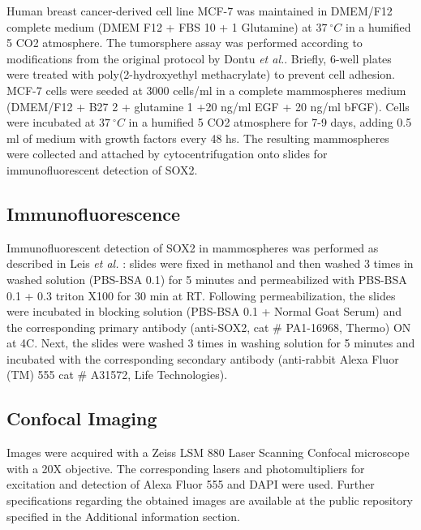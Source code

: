 \documentclass[fleqn,10pt]{wlscirep}
\begin{document}
Human breast cancer-derived cell line MCF-7 was maintained in DMEM/F12 complete medium (DMEM F12 + FBS 10 + 1 Glutamine) at $37 \ ^{\circ} C$ in a humified 5 CO2 atmosphere. The tumorsphere assay was performed according to modifications \cite{Leis} from the original protocol by Dontu \emph{et al.}\cite{Dontu}. Briefly, 6-well plates were treated with poly(2-hydroxyethyl methacrylate) to prevent cell adhesion. MCF-7 cells were seeded at 3000 cells/ml in a complete mammospheres medium (DMEM/F12 + B27 2 + glutamine 1 +20 ng/ml EGF + 20 ng/ml bFGF). Cells were incubated at $37\ ^{\circ} C$  in a humified 5 CO2 atmosphere for 7-9 days, adding 0.5 ml of medium with growth factors every 48 hs. The resulting mammospheres were collected and attached by cytocentrifugation onto slides for immunofluorescent detection of SOX2.

\subsection*{Immunofluorescence}

Immunofluorescent detection of SOX2 in mammospheres was performed as described in Leis \emph{et al.} \cite{Leis}: slides were fixed in methanol and then washed 3 times in washed solution (PBS-BSA 0.1) for 5 minutes and permeabilized with PBS-BSA 0.1 + 0.3 triton X100 for 30 min at RT. Following permeabilization, the slides were incubated in blocking solution (PBS-BSA 0.1 + Normal Goat Serum) and the corresponding primary antibody (anti-SOX2, cat \# PA1-16968, Thermo)  ON at 4C. Next, the slides were washed 3 times in washing solution for 5 minutes and incubated with the corresponding secondary antibody (anti-rabbit Alexa Fluor (TM) 555 cat \# A31572, Life Technologies).   

\subsection*{Confocal Imaging}

Images were acquired with a Zeiss LSM 880 Laser Scanning Confocal microscope with a 20X objective. The corresponding lasers and photomultipliers for excitation and detection of Alexa Fluor 555 and DAPI were used. Further specifications regarding the obtained images are available at the public repository specified in the Additional information section.
\end{document}
